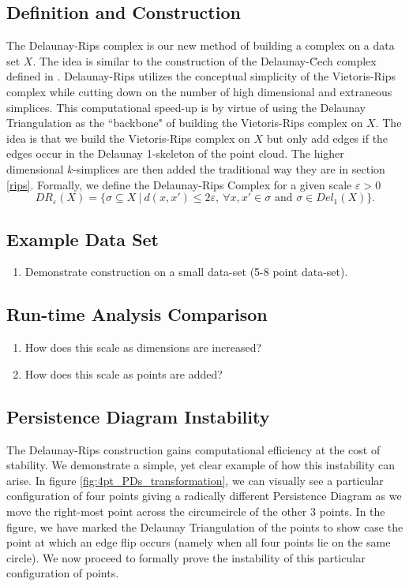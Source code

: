 \documentclass[letterpaper,titlepage]{article}
\begin{document}
\subsection{Definition and Construction} \label{del-rips:def}
The Delaunay-Rips complex is our new method of building a complex on a data set $X$. The idea is similar to the construction of the Delaunay-\u Cech complex defined in \cite{Bauer_2016}. Delaunay-Rips utilizes the conceptual simplicity of the Vietoris-Rips complex while cutting down on the number of high dimensional and extraneous simplices. This computational speed-up is by virtue of using the Delaunay Triangulation as the ``backbone" of building the Vietoris-Rips complex on $X$. The idea is that we build the Vietoris-Rips complex on $X$ but only add edges if the edges occur in the Delaunay 1-skeleton of the point cloud. The higher dimensional $k$-simplices are then added the traditional way they are in section \ref{rips}. Formally, we define the Delaunay-Rips Complex for a given scale $\varepsilon>0$
$$DR_{\varepsilon}(X) = \{\sigma \subseteq X\ |\ d(x,x') \leq 2\varepsilon,\ \forall x,x' \in \sigma \text{ and } \sigma \in Del_1(X) \}.$$


\subsection{Example Data Set}
\begin{enumerate}
    \item Demonstrate construction on a small data-set (5-8 point data-set).
\end{enumerate}

\subsection{Run-time Analysis Comparison}
\begin{enumerate}
    \item How does this scale as dimensions are increased?
    \item How does this scale as points are added?
\end{enumerate}


\subsection{Persistence Diagram Instability}
The Delaunay-Rips construction gains computational efficiency at the cost of stability. We demonstrate a simple, yet clear example of how this instability can arise. In figure \ref{fig:4pt_PDs_transformation}, we can visually see a particular configuration of four points giving a radically different Persistence Diagram as we move the right-most point across the circumcircle of the other 3 points. In the figure, we have marked the Delaunay Triangulation of the points to show case the point at which an edge flip occurs (namely when all four points lie on the same circle). We now proceed to formally prove the instability of this particular configuration of points.
\end{document}
